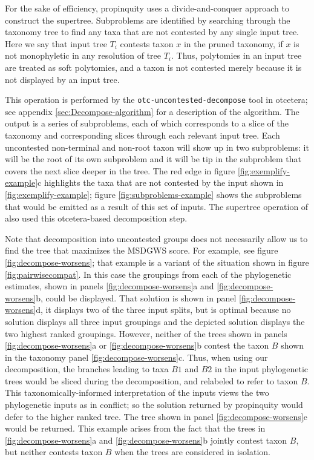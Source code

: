 \documentclass[fleqn,12pt,lineno,english]{wlpeerj}
\begin{document}
For the sake of efficiency, propinquity uses a divide-and-conquer
approach to construct the supertree. Subproblems are identified by
searching through the taxonomy tree to find any taxa that are not contested
by any single input tree. Here we say that input tree $T_{i}$ contests
taxon $x$ in the pruned taxonomy, if $x$ is not monophyletic in
any resolution of tree $T_{i}$. Thus, polytomies in an input tree
are treated as soft polytomies, and a taxon is not contested merely
because it is not displayed by an input tree. 

This operation is performed by the \texttt{otc-uncontested-decompose}
tool in otcetera; see appendix \ref{sec:Decompose-algorithm} for
a description of the algorithm. The output is a series of subproblems,
each of which corresponds to a slice of the taxonomy and corresponding
slices through each relevant input tree. Each uncontested non-terminal
and non-root taxon will show up in two subproblems: it will be the
root of its own subproblem and it will be tip in the subproblem that
covers the next slice deeper in the tree. The red edge in figure \ref{fig:exemplify-example}c
highlights the taxa that are not contested by the input shown in \ref{fig:exemplify-example};
figure \ref{fig:subproblems-example} shows the subproblems that would
be emitted as a result of this set of inputs. The supertree operation
of \citet{HinchliffEtAl2015} also used this otcetera-based decomposition
step.

Note that decomposition into uncontested groups does not necessarily
allow us to find the tree that maximizes the MSDGWS score. For example,
see figure \ref{fig:decompose-worsens}; that example is a variant
of the situation shown in figure \ref{fig:pairwisecompat}. In this
case the groupings from each of the phylogenetic estimates, shown
in panels \ref{fig:decompose-worsens}a and \ref{fig:decompose-worsens}b,
could be displayed. That solution is shown in panel \ref{fig:decompose-worsens}d,
it displays two of the three input splits, but is optimal because
no solution displays all three input groupings and the depicted solution
displays the two highest ranked groupings. However, neither of the
trees shown in panels \ref{fig:decompose-worsens}a or \ref{fig:decompose-worsens}b
contest the taxon $B$ shown in the taxonomy panel \ref{fig:decompose-worsens}c.
Thus, when using our decomposition, the branches leading to taxa $B1$
and $B2$ in the input phylogenetic trees would be sliced during the
decomposition, and relabeled to refer to taxon $B$. This taxonomically-informed
interpretation of the inputs views the two phylogenetic inputs as
in conflict; so the solution returned by propinquity would defer to
the higher ranked tree. The tree shown in panel \ref{fig:decompose-worsens}e
would be returned. This example arises from the fact that the trees
in \ref{fig:decompose-worsens}a and \ref{fig:decompose-worsens}b
jointly contest taxon $B$, but neither contests taxon $B$ when the
trees are considered in isolation.
\end{document}
